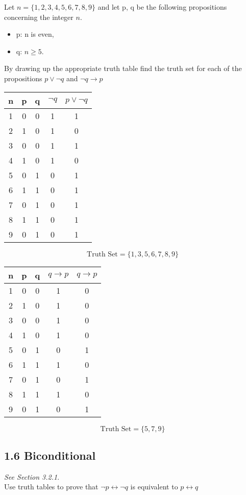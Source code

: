 \documentclass[]{report}
\begin{document}
Let $n = \{1, 2,3,4, 5,6,7, 8, 9\}$ and let p, q be the following propositions concerning the integer $n$.
\begin{itemize}
\item p: n is even, 
\item q: $n\geq 5$.
\end{itemize}
By drawing up the appropriate truth table ﬁnd the truth set for each of the
propositions $p \vee \neg q$ and $ \neg q \rightarrow p$

\begin{tabular}{|c|c|c|c|c|}
\hline n & p & q & $\neg q$ & $p \vee \neg q$ \\ 
\hline 1 & 0 & 0 & 1 & 1\\ 
\hline 2 & 1 & 0 & 1 & 0\\ 
\hline 3 & 0 & 0 & 1 & 1\\ 
\hline 4 & 1 & 0 & 1 & 0\\ 
\hline 5 & 0 & 1 & 0 & 1\\ 
\hline 6 & 1 & 1 & 0 & 1\\ 
\hline 7 & 0 & 1 & 0 & 1\\ 
\hline 8 & 1 & 1 & 0 & 1\\ 
\hline 9 & 0 & 1 & 0 & 1\\ 
\hline 
\end{tabular} 
\[\mbox{Truth Set} = \{1,3,5,6,7,8,9\}\]

\begin{tabular}{|c|c|c|c|c|}
\hline n & p & q & $  q \rightarrow p$ & $  q \rightarrow p$ \\ 
\hline 1 & 0 & 0 & 1 & 0\\ 
\hline 2 & 1 & 0 & 1 & 0\\ 
\hline 3 & 0 & 0 & 1 & 0\\ 
\hline 4 & 1 & 0 & 1 & 0\\ 
\hline 5 & 0 & 1 & 0 & 1\\ 
\hline 6 & 1 & 1 & 1 & 0\\ 
\hline 7 & 0 & 1 & 0 & 1\\ 
\hline 8 & 1 & 1 & 1 & 0\\ 
\hline 9 & 0 & 1 & 0 & 1\\ 
\hline 
\end{tabular} 
\[\mbox{Truth Set} = \{5,7,9\}\]
\newpage
\subsection*{1.6 Biconditional}
\emph{See Section 3.2.1}.\\
Use truth tables to prove that $ \neg p \leftrightarrow \neg q $ is equivalent to  $ p \leftrightarrow q $
\end{document}
